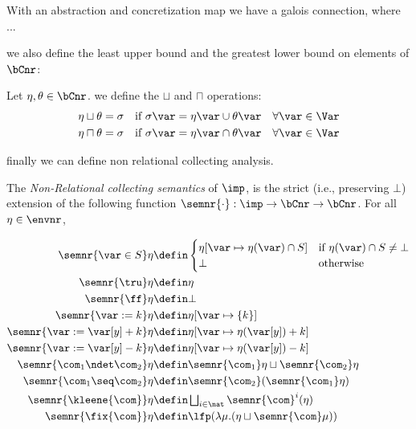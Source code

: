 With an abstraction and concretization map we have a galois
connection, where ...

we also define the least upper bound and the greatest lower bound on
elements of \(\bCnr\):

\begin{definition}
  Let \(\eta,\theta \in \bCnr\). we define the \(\sqcup\) and
  \(\sqcap\) operations:
  \begin{align*}
    \eta \sqcup \theta & = \sigma & \text{if } \sigma\var = \eta\var \cup \theta\var \quad \forall \var \in \Var \\
    \eta \sqcap \theta & = \sigma & \text{if } \sigma\var = \eta\var \cap \theta\var \quad \forall \var \in \Var \\
  \end{align*}
\end{definition}

finally we can define non relational collecting analysis.

\begin{definition}\label{def:nonrel}
  The \emph{Non-Relational collecting semantics} of \(\imp\), is the
  strict (i.e., preserving \(\bot\))
  extension of the following function \(\semnr{\cdot}: \imp \to
  \bCnr \to \bCnr\). For all \(\eta \in \envnr\),

  \begin{align*}
    \semnr{\var \in S}\eta 
    & \defin  
      \begin{cases}
        \eta[\var \mapsto \eta(\var)\cap S] & \text{if }\eta(\var)\cap S\neq \bot \\ \bot & \text{otherwise}
      \end{cases}\\
    \semnr{\tru}\eta 
    & \defin \eta\\
    \semnr{\ff}\eta 
    & \defin \bot\\
    \semnr{\var := k}\eta 
    & \defin \eta[\var \mapsto \{k\}]\\
    \semnr{\var := \var[y] + k}\eta 
    & \defin \eta[\var \mapsto \eta (\var[y]) + k]\\
    \semnr{\var := \var[y] - k}\eta 
    & \defin \eta[\var \mapsto \eta (\var[y]) - k]\\
    \semnr{\com_1 \ndet \com_2} \eta
    & \defin \semnr{\com_1} \eta \sqcup \semnr{\com_2} \eta\\
    \semnr{\com_1 \seq \com_2} \eta
    & \defin \semnr{\com_2} (\semnr{\com_1} \eta)\\
    \semnr{\kleene{\com}} \eta
    & \defin \textstyle \bigsqcup_{i \in \nat} \semnr{\com}^i (\eta)\\
    \semnr{\fix{\com}} \eta
    & \defin  \lfp(\lambda \mu. (\eta \sqcup \semnr{\com} \mu))
  \end{align*}
\end{definition}